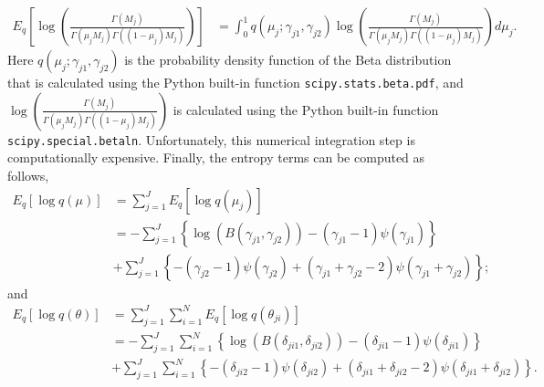 \documentclass[11pt,reqno]{amsart}
\begin{document}
\begin{equation}\label{eqn:integration}
\begin{split}
E_q\left[ \log \left( \frac{ \Gamma(M_j) } { \Gamma(\mu_j M_j) \Gamma((1-\mu_j)M_j ) }\right)\right] &= \int_{0}^{1} q(\mu_j;\gamma_{j1}, \gamma_{j2}) \log \left( \frac{ \Gamma(M_j) } { \Gamma(\mu_j M_j) \Gamma((1-\mu_j)M_j ) }\right) d\mu_j.
\end{split}
\end{equation}
Here $q(\mu_j;\gamma_{j1}, \gamma_{j2})$ is the probability density function of the Beta distribution that is calculated using the Python built-in function \texttt{scipy.stats.beta.pdf},
and $\log \left( \frac{ \Gamma(M_j) } { \Gamma(\mu_j M_j) \Gamma((1-\mu_j)M_j ) }\right)$ is calculated using the Python built-in function \texttt{scipy.special.betaln}.
Unfortunately, this numerical integration step is computationally expensive.
%
Finally, the entropy terms can be computed as follows,
\begin{equation}
\begin{split}
E_q \left[ \log q\left(\mu \right)\right] &= \sum_{j=1}^{J} E_q \left[ \log q(\mu_j)\right] \\
&= -\sum_{j=1}^{J} \left\lbrace \log (B(\gamma_{j1},\gamma_{j2})) -(\gamma_{j1}-1)\psi(\gamma_{j1}) \right\rbrace \\
& + \sum_{j=1}^{J} \left\lbrace -(\gamma_{j2}-1)\psi(\gamma_{j2}) + (\gamma_{j1}+\gamma_{j2}-2)\psi(\gamma_{j1}+\gamma_{j2})\right\rbrace;
\end{split}
\end{equation}
and
\begin{equation}
\begin{split}
E_q \left[ \log q\left(\theta \right)\right] &= \sum_{j=1}^{J}\sum_{i=1}^{N} E_q\left[ \log q(\theta_{ji})\right] \\
&= -\sum_{j=1}^{J}\sum_{i=1}^{N} \left\lbrace \log (B(\delta_{ji1},\delta_{ji2}))-(\delta_{ji1}-1)\psi(\delta_{ji1}) \right\rbrace \\
& + \sum_{j=1}^{J}\sum_{i=1}^{N} \left\lbrace -(\delta_{ji2}-1)\psi(\delta_{ji2}) + (\delta_{ji1}+\delta_{ji2}-2)\psi(\delta_{ji1}+\delta_{ji2})\right\rbrace.
\end{split}
\end{equation}
%
\end{document}
